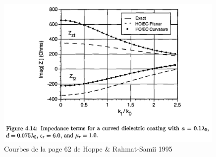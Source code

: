 \begin{figure}[h!tb]
    \includegraphics[width=0.99\textwidth]{images/hoppe/p62_imp_cylindre.png}
    \caption{Courbes de la page 62 de Hoppe \& Rahmat-Samii 1995}
    \label{fig:annex:hoppe:p62}
\end{figure}
